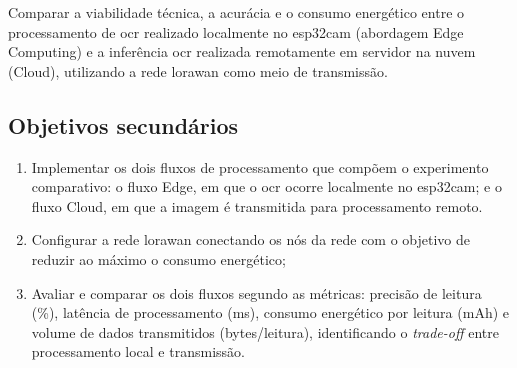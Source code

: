 
Comparar a viabilidade técnica, a acurácia e o consumo energético entre o processamento de \gls{ocr} realizado localmente no \gls{esp32cam} (abordagem Edge Computing) e a inferência \gls{ocr} realizada remotamente em servidor na nuvem (Cloud), utilizando a rede \gls{lorawan} como meio de transmissão.

\subsection{Objetivos secundários}

\begin{enumerate}
    \item Implementar os dois fluxos de processamento que compõem o experimento comparativo: o fluxo Edge, em que o \gls{ocr} ocorre localmente no \gls{esp32cam}; e o fluxo Cloud, em que a imagem é transmitida para processamento remoto. %
    \item Configurar a rede \gls{lorawan} conectando os nós da rede com o objetivo de reduzir ao máximo o consumo energético; %
    \item Avaliar e comparar os dois fluxos segundo as métricas: precisão de leitura (\%), latência de processamento (ms), consumo energético por leitura (mAh) e volume de dados transmitidos (bytes/leitura), identificando o \textit{trade-off} entre processamento local e transmissão. %
\end{enumerate}